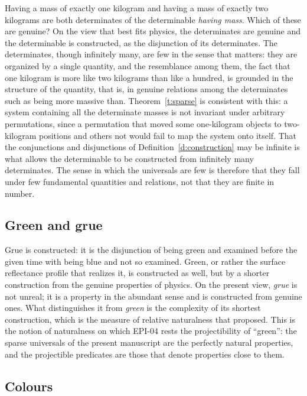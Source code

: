 \documentclass{situationist-preprint}
\begin{document}
Having a mass of exactly one kilogram and having a mass of exactly two kilograms are both determinates of the determinable \emph{having mass}. Which of these are genuine? On the view that best fits physics, the determinates are genuine and the determinable is constructed, as the disjunction of its determinates. The determinates, though infinitely many, are few in the sense that matters: they are organized by a single quantity, and the resemblance among them, the fact that one kilogram is more like two kilograms than like a hundred, is grounded in the structure of the quantity, that is, in genuine relations among the determinates such as being more massive than. Theorem~\ref{t:sparse} is consistent with this: a system containing all the determinate masses is not invariant under arbitrary permutations, since a permutation that moved some one-kilogram objects to two-kilogram positions and others not would fail to map the system onto itself. That the conjunctions and disjunctions of Definition~\ref{d:construction} may be infinite is what allows the determinable to be constructed from infinitely many determinates. The sense in which the universals are few is therefore that they fall under few fundamental quantities and relations, not that they are finite in number.

\subsection{Green and grue}

Grue is constructed: it is the disjunction of being green and examined before the given time with being blue and not so examined. Green, or rather the surface reflectance profile that realizes it, is constructed as well, but by a shorter construction from the genuine properties of physics. On the present view, \emph{grue} is not unreal; it is a property in the abundant sense and is constructed from genuine ones. What distinguishes it from \emph{green} is the complexity of its shortest construction, which is the measure of relative naturalness that \citet[p.~61]{Lewis1986} proposed. This is the notion of naturalness on which EPI-04 rests the projectibility of \enquote{green}: the sparse universals of the present manuscript are the perfectly natural properties, and the projectible predicates are those that denote properties close to them.

\subsection{Colours}
\end{document}
